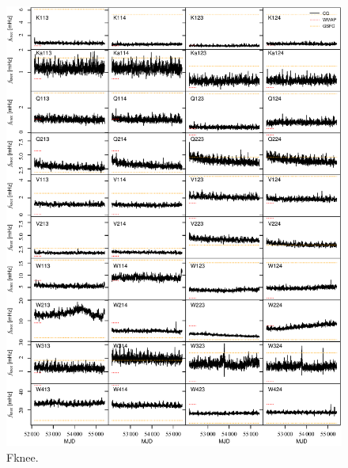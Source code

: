 \documentclass[twocolumn]{../../common/aa}
\begin{document}
\begin{figure}[p]
  	\centering
	\includegraphics[width=\textwidth]{figures/instpar_CG_fknee_v1.pdf}
	\caption{Fknee.}
	\label{fig:fknee}
\end{figure}
\end{document}
